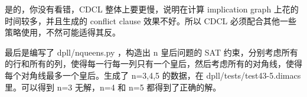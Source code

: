 \documentclass[11pt,a4paper]{ctexart}
\begin{document}
是的，你没有看错，CDCL 整体上要更慢，说明在计算 implication graph 上花的时间较多，并且生成的 conflict clause 效果不好。所以 CDCL 必须配合其他一些策略使用，不然可能适得其反。

最后是编写了 dpll/nqueens.py ，构造出 n 皇后问题的 SAT 约束，分别考虑所有的行和所有的列，使得每一行每一列只有一个皇后，然后考虑所有的对角线，使得每个对角线最多一个皇后。生成了 n=3,4,5 的数据，在 dpll/tests/test4{3-5}.dimacs 里。可以得到 n=3 无解，n=4 和 n=5 都得到了正确的解。

\printbibliography
\end{document}
